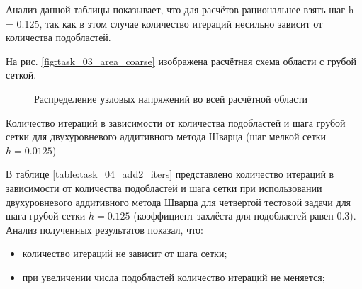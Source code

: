 \documentclass[a4paper]{article}
\begin{document}
Анализ данной таблицы показывает, что для расчётов рациональнее взять шаг h = 0.125, так как в этом случае количество итераций несильно зависит от количества подобластей.

На рис. \ref{fig:task_03_area_coarse} изображена расчётная схема области с грубой сеткой.

\begin{figure}[h]
\caption{Распределение узловых напряжений во всей расчётной области}
\label{fig:task_04_area_coarse}
\end{figure}

\newpage

\begin{table}[h]
\caption{Количество итераций в зависимости от количества подобластей и шага грубой сетки для двухуровневого аддитивного метода Шварца (шаг мелкой сетки $h = 0.0125$)}
\label{table:task_04_add2_coarse}
\end{table}

В таблице \ref{table:task_04_add2_iters} представлено количество итераций в зависимости от количества подобластей и шага сетки при использовании двухуровневого аддитивного метода Шварца для четвертой тестовой задачи для шага грубой сетки $h = 0.125$ (коэффициент захлёста для подобластей равен 0.3). Анализ полученных результатов показал, что:
\begin{itemize}
\item количество итераций не зависит от шага сетки;
\item при увеличении числа подобластей количество итераций не меняется;
\end{itemize}
\end{document}
